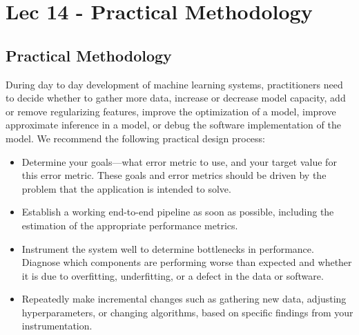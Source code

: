 \chapter{Lec 14 - Practical Methodology}

\section{Practical Methodology}
During day to day development of machine learning systems, practitioners need to decide whether to gather more data, increase or decrease model capacity, add or remove regularizing features, improve the optimization of a model, improve approximate inference in a model, or debug the software implementation of the model.\newline\newline
We recommend the following practical design process:
\begin{itemize}
    \item Determine your goals—what error metric to use, and your target value for
    this error metric. These goals and error metrics should be driven by the
    problem that the application is intended to solve.

    \item Establish a working end-to-end pipeline as soon as possible, including the estimation of the appropriate performance metrics.

    \item Instrument the system well to determine bottlenecks in performance. Diagnose which components are performing worse than expected and whether it is due to overfitting, underfitting, or a defect in the data or software.

    \item Repeatedly make incremental changes such as gathering new data, adjusting
    hyperparameters, or changing algorithms, based on specific findings from
    your instrumentation.
\end{itemize}


